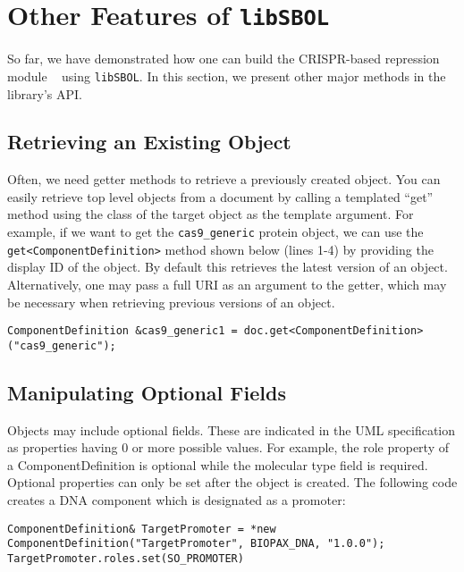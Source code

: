 \section*{Other Features of {\tt libSBOL}}
So far, we have demonstrated how one can build the CRISPR-based repression module ~\cite{kiani2014crispr} using {\tt libSBOL}. In this section, we present other major methods in the library's API. 

\subsection*{Retrieving an Existing Object}
Often, we need getter methods to retrieve a previously created object. You can easily retrieve top level objects from a document by calling a templated ``get'' method using the class of the target object as the template argument. For example, if we want to get the \lstinline+cas9_generic+ protein  object, we can use the \lstinline+get<ComponentDefinition>+ method shown below (lines 1-4) by providing the display ID of the object. By default this retrieves the latest version of an object. Alternatively, one may pass a full URI as an argument to the getter, which may be necessary when retrieving previous versions of an object.

\vspace{\abovedisplayskip}
\begin{minipage}{0.95\textwidth} 
\begin{lstlisting}
ComponentDefinition &cas9_generic1 = doc.get<ComponentDefinition>("cas9_generic");
\end{lstlisting}
\end{minipage}

\subsection*{Manipulating Optional Fields}
Objects may include optional fields. These are indicated in the UML specification as properties having 0 or more possible values. For example, the role property of a ComponentDefinition is optional while the molecular type field is required. Optional properties can only be set after the object is created. The following code creates a DNA component which is designated as a promoter:

\vspace{\abovedisplayskip}
\begin{minipage}{0.95\textwidth} 
\begin{lstlisting}
ComponentDefinition& TargetPromoter = *new ComponentDefinition("TargetPromoter", BIOPAX_DNA, "1.0.0");
TargetPromoter.roles.set(SO_PROMOTER)
\end{lstlisting}
\end{minipage}


